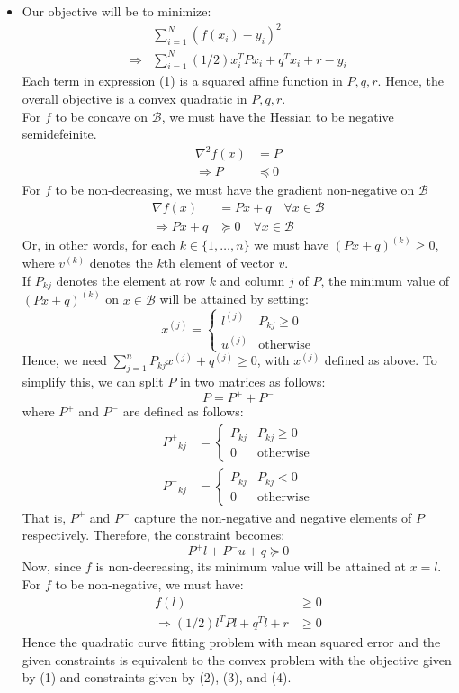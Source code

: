 \documentclass{article}
\newcommand{\1}{\mathbf{1}}
\begin{document}
\begin{itemize}
  \item[6.10] Our objective will be to minimize:
  \begin{align*}
    &\sum_{i=1}^N (f(x_i) - y_i)^2 \\
    \Rightarrow &\sum_{i=1}^N (1/2) x_i^T P x_i + q^T x_i + r - y_i \tag{1}
  \end{align*}
  Each term in expression (1) is a squared affine function in $P, q, r$. Hence, the overall objective is a convex quadratic in $P, q, r$. \\
  For $f$ to be concave on $\mathcal{B}$, we must have the Hessian to be negative semidefeinite.
  \begin{align*}
    \nabla^2 f(x) &= P \\
    \Rightarrow P &\preceq 0 \tag{2}
  \end{align*}
  For $f$ to be non-decreasing, we must have the gradient non-negative on $\mathcal{B}$
  \begin{align*}
    \nabla f(x) &= P x + q \quad \forall x \in \mathcal{B} \\
    \Rightarrow P x + q &\succeq 0 \quad \forall x \in \mathcal{B}
  \end{align*}
  Or, in other words, for each $k \in \{1, \dots, n\}$ we must have $(P x + q)^{(k)} \ge 0$, where $v^{(k)}$ denotes the $k$th element of vector $v$. \\
  If $P_{kj}$ denotes the element at row $k$ and column $j$ of $P$, the minimum value of $(P x + q)^{(k)}$ on $x \in \mathcal{B}$ will be attained by setting:
  \[ x^{(j)} = \begin{cases} l^{(j)} & P_{kj} \ge 0 \\ u^{(j)} & \text{otherwise} \end{cases} \]
  Hence, we need $\sum_{j=1}^n P_{kj} x^{(j)} + q^{(j)} \ge 0$, with $x^{(j)}$ defined as above. To simplify this, we can split $P$ in two matrices as follows:
  \[ P = P^+ + P^- \]
  where $P^+$ and $P^-$ are defined as follows:
  \begin{align*}
    {P^+}_{kj} &= \begin{cases} P_{kj} & P_{kj} \ge 0 \\ 0 & \text{otherwise} \end{cases} \\
    {P^-}_{kj} &= \begin{cases} P_{kj} & P_{kj} < 0 \\ 0 & \text{otherwise} \end{cases}
  \end{align*}
  That is, $P^+$ and $P^-$ capture the non-negative and negative elements of $P$ respectively. Therefore, the constraint becomes:
  \[ P^+ l + P^- u + q \succeq 0 \tag{3} \]
  Now, since $f$ is non-decreasing, its minimum value will be attained at $x = l$. For $f$ to be non-negative, we must have:
  \begin{align*}
    f(l) &\ge 0 \\
    \Rightarrow (1/2) l^T P l + q^T l + r &\ge 0 \tag{4}
  \end{align*}
  Hence the quadratic curve fitting problem with mean squared error and the given constraints is equivalent to the convex problem with the objective given by (1) and constraints given by (2), (3), and (4).


\end{itemize}
\end{document}

